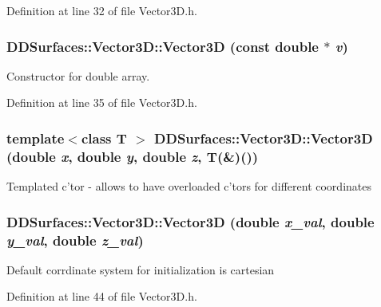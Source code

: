Definition at line 32 of file Vector3D.h.\hypertarget{class_d_d_surfaces_1_1_vector3_d_a2f148efd6032e40a105962cd7c4aed78}{
\subsubsection[{Vector3D}]{\setlength{\rightskip}{0pt plus 5cm}DDSurfaces::Vector3D::Vector3D (const double $\ast$ {\em v})}}
\label{class_d_d_surfaces_1_1_vector3_d_a2f148efd6032e40a105962cd7c4aed78}
Constructor for double array. 

Definition at line 35 of file Vector3D.h.\hypertarget{class_d_d_surfaces_1_1_vector3_d_a84e13e88dbf750cf3b12117746226a9a}{
\subsubsection[{Vector3D}]{\setlength{\rightskip}{0pt plus 5cm}template$<$class T $>$ DDSurfaces::Vector3D::Vector3D (double {\em x}, \/  double {\em y}, \/  double {\em z}, \/  {\bf T}(\&)())}}
\label{class_d_d_surfaces_1_1_vector3_d_a84e13e88dbf750cf3b12117746226a9a}
Templated c'tor -\/ allows to have overloaded c'tors for different coordinates \hypertarget{class_d_d_surfaces_1_1_vector3_d_a145fc8c25d65f9f53ee0bc782b0a2e62}{
\subsubsection[{Vector3D}]{\setlength{\rightskip}{0pt plus 5cm}DDSurfaces::Vector3D::Vector3D (double {\em x\_\-val}, \/  double {\em y\_\-val}, \/  double {\em z\_\-val})}}
\label{class_d_d_surfaces_1_1_vector3_d_a145fc8c25d65f9f53ee0bc782b0a2e62}
Default corrdinate system for initialization is cartesian 

Definition at line 44 of file Vector3D.h.

